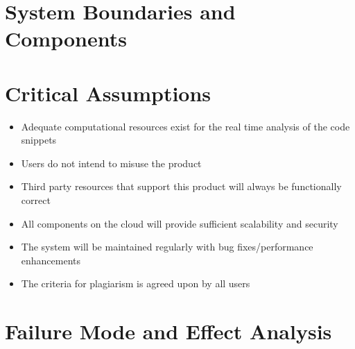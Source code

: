 \documentclass{article}
\begin{document}
\section{System Boundaries and Components}


\section{Critical Assumptions}
\begin{itemize}
    \item Adequate computational resources exist for the real time analysis of the code snippets
    \item Users do not intend to misuse the product
    \item Third party resources that support this product will always be functionally correct
    \item All components on the cloud will provide sufficient scalability and security
    \item The system will be maintained regularly with bug fixes/performance enhancements
    \item The criteria for plagiarism is agreed upon by all users
\end{itemize}

\section{Failure Mode and Effect Analysis}
\end{document}
